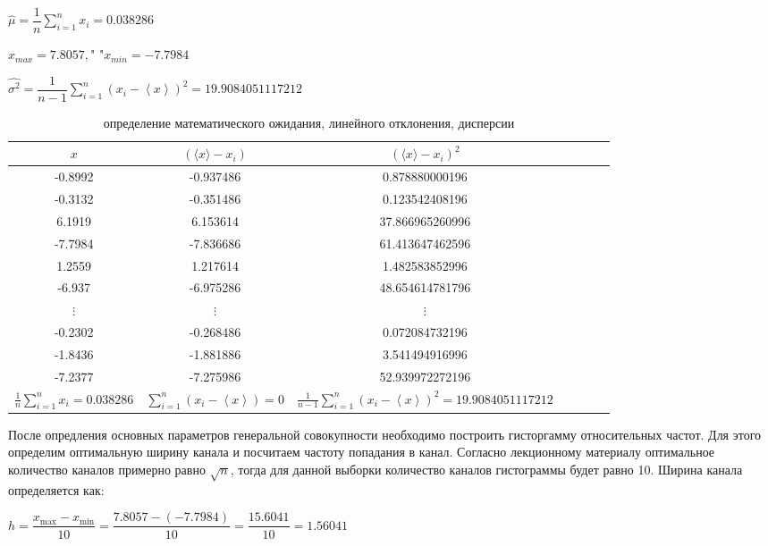 \documentclass[a4paper, 12pt]{article}
\begin{document}
	\begin{center}
		$ \hat{\mu}= \dfrac{1}{n} \sum\limits_{i=1}^n {x_i} = 0.038286 $
		
		$ x_{max} = 7.8057, \text{"  "} x_{min} = -7.7984 $
		
		$ \hat{\sigma^2} = \dfrac{1}{n-1} \sum\limits_{i=1}^{n} (x_i - \left< x \right>)^2 = 19.9084051117212 $
		
		\begin{table}[h!]
		\centering
		\begin{tabular}{|c|c|c|c|c|c|c|}
			\hline
				$x$ & $(\langle x \rangle -x_i)$ & $(\langle x \rangle-x_i)^2$ \\
			\hline
			-0.8992 & -0.937486 & 0.878880000196 \\
			-0.3132 & -0.351486 & 0.123542408196 \\
			6.1919 & 6.153614 & 37.866965260996 \\
			-7.7984 & -7.836686 & 61.413647462596 \\
			1.2559 & 1.217614 & 1.482583852996 \\
			-6.937 & -6.975286 & 48.654614781796 \\
				$\vdots$ & $\vdots$ & $\vdots$ \\
				-0.2302 & -0.268486 & 0.072084732196 \\
				-1.8436 & -1.881886 & 3.541494916996 \\
				-7.2377 & -7.275986 & 52.939972272196 \\
			\hline
				$\frac{1}{n} \sum\limits_{i=1}^n {x_i} = 0.038286$ & $\sum\limits_{i=1}^n (x_i-\left< x \right>) = 0$ & $\frac{1}{n-1} \sum\limits_{i=1}^{n} (x_i - \left< x \right>)^2 = 19.9084051117212$ \\
			\hline
		\end{tabular}
		\caption{определение математического ожидания, линейного отклонения, дисперсии}
	\end{table}
	
	\end{center}
	
	\quad После опредления основных параметров генеральной совокупности необходимо построить гисторгамму относительных частот. Для этого определим оптимальную ширину канала и посчитаем частоту попадания в канал. Согласно лекционному материалу оптимальное количество каналов примерно равно $\sqrt{n}$, тогда для данной выборки количество каналов гистограммы будет равно 10. Ширина канала определяется как: 
	
	\begin{center}
		$ h = \dfrac{x_{\text{max}}-x_{\text{min}}}{10} = \dfrac{7.8057 - (-7.7984)}{10} = \dfrac{15.6041}{10} = 1.56041 $
	\end{center}
	
\end{document}
